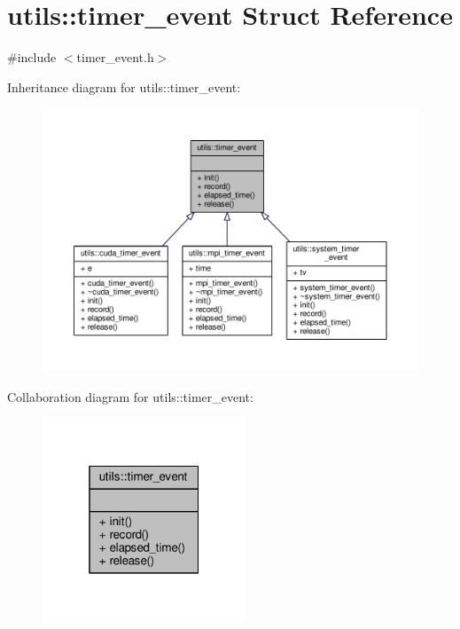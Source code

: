 \hypertarget{structutils_1_1timer__event}{\section{utils\-:\-:timer\-\_\-event Struct Reference}
\label{structutils_1_1timer__event}
}


{\ttfamily \#include $<$timer\-\_\-event.\-h$>$}



Inheritance diagram for utils\-:\-:timer\-\_\-event\-:
\nopagebreak
\begin{figure}[H]
\begin{center}
\leavevmode
\includegraphics[width=350pt]{structutils_1_1timer__event__inherit__graph}
\end{center}
\end{figure}


Collaboration diagram for utils\-:\-:timer\-\_\-event\-:
\nopagebreak
\begin{figure}[H]
\begin{center}
\leavevmode
\includegraphics[width=172pt]{structutils_1_1timer__event__coll__graph}
\end{center}
\end{figure}
